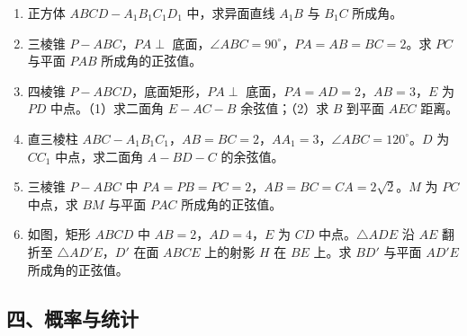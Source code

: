 \begin{enumerate}
  \item[★] 正方体 $ABCD-A_1B_1C_1D_1$ 中，求异面直线 $A_1B$ 与 $B_1C$ 所成角。
  \vspace{1.5cm}
  \item[★] 三棱锥 $P-ABC$，$PA\perp$ 底面，$\angle ABC=90^\circ$，$PA=AB=BC=2$。求 $PC$ 与平面 $PAB$ 所成角的正弦值。
  \vspace{3cm}
  \item[★★] 四棱锥 $P-ABCD$，底面矩形，$PA\perp$ 底面，$PA=AD=2$，$AB=3$，$E$ 为 $PD$ 中点。（1）求二面角 $E-AC-B$ 余弦值；（2）求 $B$ 到平面 $AEC$ 距离。
  \vspace{4cm}
  \item[★★] 直三棱柱 $ABC-A_1B_1C_1$，$AB=BC=2$，$AA_1=3$，$\angle ABC=120^\circ$。$D$ 为 $CC_1$ 中点，求二面角 $A-BD-C$ 的余弦值。
  \vspace{4cm}
  \item[★★] 三棱锥 $P-ABC$ 中 $PA=PB=PC=2$，$AB=BC=CA=2\sqrt2$。$M$ 为 $PC$ 中点，求 $BM$ 与平面 $PAC$ 所成角的正弦值。
  \vspace{4cm}
  \item[★★★] 如图，矩形 $ABCD$ 中 $AB=2$，$AD=4$，$E$ 为 $CD$ 中点。$\triangle ADE$ 沿 $AE$ 翻折至 $\triangle AD'E$，$D'$ 在面 $ABCE$ 上的射影 $H$ 在 $BE$ 上。求 $BD'$ 与平面 $AD'E$ 所成角的正弦值。
  \vspace{4cm}
\end{enumerate}

\subsection{四、概率与统计}

